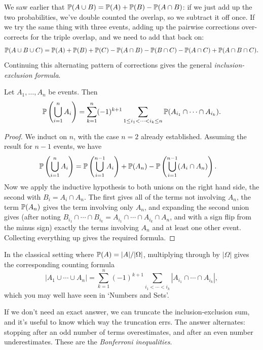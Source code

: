\documentclass[a4paper]{scrartcl}
\begin{document}
We saw earlier that $\mathbb{P}(A \cup B) = \mathbb{P}(A) + \mathbb{P}(B) - \mathbb{P}(A \cap B)$: if we just add up the two probabilities, we've double counted the overlap, so we subtract it off once. If we try the same thing with three events, adding up the pairwise corrections over-corrects for the triple overlap, and we need to add that back on:
$$
\mathbb{P}(A \cup B \cup C) = \mathbb{P}(A) + \mathbb{P}(B) + \mathbb{P}(C) - \mathbb{P}(A \cap B) - \mathbb{P}(B \cap C) - \mathbb{P}(A \cap C) + \mathbb{P}(A \cap B \cap C).
$$
Continuing this alternating pattern of corrections gives the general \emph{inclusion-exclusion formula}.

\begin{theorem}
	Let $A_1, \dots, A_n$ be events. Then
	$$
	\mathbb{P}\left(\bigcup_{i = 1}^{n} A_i\right) = \sum_{k = 1}^{n} (-1)^{k + 1} \sum_{1 \leq i_1 < \cdots < i_k \leq n} \mathbb{P}(A_{i_1} \cap \cdots \cap A_{i_k}).
	$$
\end{theorem}
\begin{proof}
	We induct on $n$, with the case $n = 2$ already established. Assuming the result for $n - 1$ events, we have
	\begin{align*}
		\mathbb{P}\left(\bigcup_{i = 1}^{n} A_i\right) &= \mathbb{P}\left(\bigcup_{i = 1}^{n-1} A_i\right) + \mathbb{P}(A_n) - \mathbb{P}\left(\bigcup_{i = 1}^{n - 1} (A_i \cap A_n)\right).
	\end{align*}
	Now we apply the inductive hypothesis to both unions on the right hand side, the second with $B_i = A_i \cap A_n$. The first gives all of the terms not involving $A_n$, the term $\mathbb{P}(A_n)$ gives the term involving only $A_n$, and expanding the second union gives (after noting $B_{i_1} \cap \cdots \cap B_{i_k} = A_{i_1} \cap \cdots \cap A_{i_k} \cap A_n$, and with a sign flip from the minus sign) exactly the terms involving $A_n$ and at least one other event. Collecting everything up gives the required formula.
\end{proof}

\begin{remark}
	In the classical setting where $\mathbb{P}(A) = |A|/|\Omega|$, multiplying through by $|\Omega|$ gives the corresponding counting formula
	$$
	|A_1 \cup \cdots \cup A_n| = \sum_{k = 1}^{n} (-1)^{k + 1} \sum_{i_1 < \cdots < i_k} |A_{i_1} \cap \cdots \cap A_{i_k}|,
	$$
	which you may well have seen in `Numbers and Sets'.
\end{remark}

If we don't need an exact answer, we can truncate the inclusion-exclusion sum, and it's useful to know which way the truncation errs. The answer alternates: stopping after an odd number of terms overestimates, and after an even number underestimates. These are the \emph{Bonferroni inequalities}.
\end{document}
